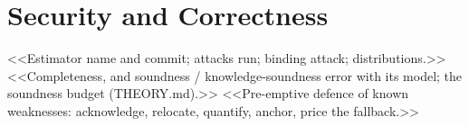\section{Security and Correctness}\label{sec:security}
<<Estimator name and commit; attacks run; binding attack; distributions.>>
<<Completeness, and soundness / knowledge-soundness error with its model; the soundness budget (THEORY.md).>>
<<Pre-emptive defence of known weaknesses: acknowledge, relocate, quantify, anchor, price the fallback.>>
